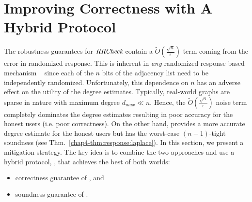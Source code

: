 \section{Improving Correctness with A Hybrid Protocol}\label{chap4-sec:hybrid}
The robustness guarantees for $\textit{RRCheck}{}$ contain a $\tilde{O}(\frac{\sqrt{n}}{\epsilon})$ term coming from the error in randomized response.
This is inherent in \textit{any} randomized response based mechanism  ~\cite{error1,error2,error3} since each of the $n$ bits of the adjacency list need to be independently randomized. Unfortunately, this dependence on $n$ has an adverse effect on the utility of the degree estimates. Typically, real-world graphs are sparse in nature with maximum degree $d_{max}\ll n$. Hence, the $\tilde{O}(\frac{\sqrt{n}}{\epsilon})$ noise term completely dominates the degree estimates resulting in poor accuracy for the honest users %
(i.e. poor correctness). On the other hand, \RLap{} provides a more accurate degree estimate for the honest users but has the worst-case $(n-1)$-tight soundness (see Thm.~\ref{chap4-thm:response:laplace}). In this section, we present a mitigation strategy. The key idea is to combine the two approaches and use a hybrid protocol, \DegHybrid, that achieves the best of both worlds: 
\begin{itemize} \item correctness guarantee of \RLap, and \item soundness guarantee of \DegRRCheck. \end{itemize}

